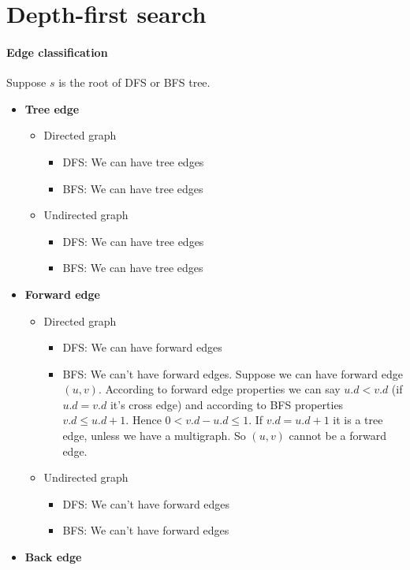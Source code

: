 \documentclass{book}
\begin{document}
	\section{Depth-first search}
	\label{psec:EdgeClassification}
	\paragraph{Edge classification}
	Suppose $s$ is the root of DFS or BFS tree.
	\begin{itemize}
		\item \textbf{Tree edge}
		\begin{itemize}
			\item Directed graph
			\begin{itemize}
				\item DFS: We can have tree edges
				\item BFS: We can have tree edges
			\end{itemize}
			\item Undirected graph
			\begin{itemize}
				\item DFS: We can have tree edges
				\item BFS: We can have tree edges
			\end{itemize}				
		\end{itemize}
		\item \textbf{Forward edge}
		\begin{itemize}
			\item Directed graph
			\begin{itemize}
				\item DFS: We can have forward edges
				\item BFS: We can't have forward edges. Suppose we can have forward edge $(u, v)$. According to forward edge properties we can say $u.d < v.d$ (if $u.d = v.d$ it's cross edge) and according to BFS properties $v.d \le u.d + 1$. Hence $0 < v.d - u.d \le 1$. If $v.d = u.d + 1$ it is a tree edge, unless we have a multigraph. So $(u, v)$ cannot be a forward edge.
			\end{itemize}
			\item Undirected graph
			\begin{itemize}
				\item DFS: We can't have forward edges
				\item BFS: We can't have forward edges
			\end{itemize}				
		\end{itemize}
		\item \textbf{Back edge}

\end{itemize}
\end{document}
